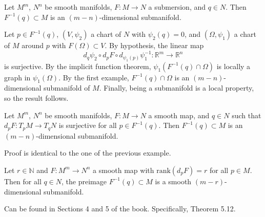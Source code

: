 \documentclass{ximera}
\begin{document}
    \begin{example}
        Let $M^m$, $N^n$ be smooth manifolds, $F : M \to N$ a submersion, and $q \in N$. Then $F^{-1} (q) \subset M$ is an $(m-n)$-dimensional submanifold.

    \begin{solution}
        Let $p \in F^{-1} (q)$, $(V, \psi _2 )$ a chart of $N$ with $\psi _2 (q) = 0$, and  $(\Omega , \psi _1 )$ a chart of $M $ around $p$ with $F(\Omega ) \subset V$. By hypothesis, the linear map
        \[    d_q \psi _2 \circ d _p F \circ d_{\psi_1(p)} \psi_1 ^{-1} : \mathbb{R}^m \to \mathbb{R}^n                                    \]
        is surjective. By the implicit function theorem, $\psi _1 ( F^{-1}(q) \cap \Omega )$ is locally a graph in $\psi _1 (\Omega )$. By the first example, $F^{-1}(q) \cap \Omega$ is an $(m-n)$-dimensional submanifold of $M$. Finally, being a submanifold is a local property, so the result follows.
    \end{solution}
    \end{example}

    \begin{example}
        Let $M^m$, $N^n$ be smooth manifolds, $F : M \to N$ a smooth map, and $q \in N$ such that $d_pF : T_p M \to T_{q}N$ is surjective for all $p \in F^{-1}(q)$. Then $F^{-1} (q) \subset M$ is an $(m-n)$-dimensional submanifold.

    \begin{solution}
        Proof is identical to the one of the previous example.
    \end{solution}
    \end{example}

    \begin{example}
        Let $r \in \mathbb{N}$ and $F : M^m \to N^n$ a smooth map with $\text{rank} ( d_p F ) = r $ for all $p\in M$. Then for all $q \in N $, the preimage $F^{-1}(q) \subset M $ is a smooth $(m-r)$-dimensional submanifold.

    \begin{solution}
        Can be found in Sections 4 and 5 of the book. Specifically, Theorem 5.12.
    \end{solution}
    \end{example}
\end{document}
